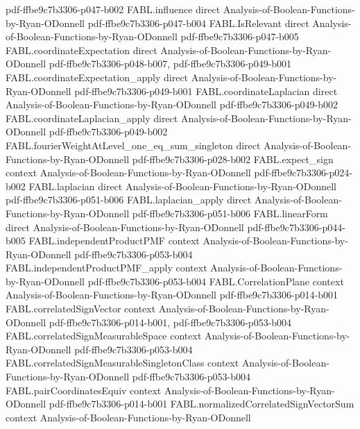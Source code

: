 \begin{theorem}
  {pdf-ffbe9c7b3306-p047-b002}
\proofstep
  {FABL.influence}
  {direct}
  {Analysis-of-Boolean-Functions-by-Ryan-ODonnell}
  {pdf-ffbe9c7b3306-p047-b004}
\proofstep
  {FABL.IsRelevant}
  {direct}
  {Analysis-of-Boolean-Functions-by-Ryan-ODonnell}
  {pdf-ffbe9c7b3306-p047-b005}
\proofstep
  {FABL.coordinateExpectation}
  {direct}
  {Analysis-of-Boolean-Functions-by-Ryan-ODonnell}
  {pdf-ffbe9c7b3306-p048-b007,
    pdf-ffbe9c7b3306-p049-b001}
\proofstep
  {FABL.coordinateExpectation_apply}
  {direct}
  {Analysis-of-Boolean-Functions-by-Ryan-ODonnell}
  {pdf-ffbe9c7b3306-p049-b001}
\proofstep
  {FABL.coordinateLaplacian}
  {direct}
  {Analysis-of-Boolean-Functions-by-Ryan-ODonnell}
  {pdf-ffbe9c7b3306-p049-b002}
\proofstep
  {FABL.coordinateLaplacian_apply}
  {direct}
  {Analysis-of-Boolean-Functions-by-Ryan-ODonnell}
  {pdf-ffbe9c7b3306-p049-b002}
\proofstep
  {FABL.fourierWeightAtLevel_one_eq_sum_singleton}
  {direct}
  {Analysis-of-Boolean-Functions-by-Ryan-ODonnell}
  {pdf-ffbe9c7b3306-p028-b002}
\proofstep
  {FABL.expect_sign}
  {context}
  {Analysis-of-Boolean-Functions-by-Ryan-ODonnell}
  {pdf-ffbe9c7b3306-p024-b002}
\proofstep
  {FABL.laplacian}
  {direct}
  {Analysis-of-Boolean-Functions-by-Ryan-ODonnell}
  {pdf-ffbe9c7b3306-p051-b006}
\proofstep
  {FABL.laplacian_apply}
  {direct}
  {Analysis-of-Boolean-Functions-by-Ryan-ODonnell}
  {pdf-ffbe9c7b3306-p051-b006}
\proofstep
  {FABL.linearForm}
  {direct}
  {Analysis-of-Boolean-Functions-by-Ryan-ODonnell}
  {pdf-ffbe9c7b3306-p044-b005}
\proofstep
  {FABL.independentProductPMF}
  {context}
  {Analysis-of-Boolean-Functions-by-Ryan-ODonnell}
  {pdf-ffbe9c7b3306-p053-b004}
\proofstep
  {FABL.independentProductPMF_apply}
  {context}
  {Analysis-of-Boolean-Functions-by-Ryan-ODonnell}
  {pdf-ffbe9c7b3306-p053-b004}
\proofstep
  {FABL.CorrelationPlane}
  {context}
  {Analysis-of-Boolean-Functions-by-Ryan-ODonnell}
  {pdf-ffbe9c7b3306-p014-b001}
\proofstep
  {FABL.correlatedSignVector}
  {context}
  {Analysis-of-Boolean-Functions-by-Ryan-ODonnell}
  {pdf-ffbe9c7b3306-p014-b001,
    pdf-ffbe9c7b3306-p053-b004}
\proofstep
  {FABL.correlatedSignMeasurableSpace}
  {context}
  {Analysis-of-Boolean-Functions-by-Ryan-ODonnell}
  {pdf-ffbe9c7b3306-p053-b004}
\proofstep
  {FABL.correlatedSignMeasurableSingletonClass}
  {context}
  {Analysis-of-Boolean-Functions-by-Ryan-ODonnell}
  {pdf-ffbe9c7b3306-p053-b004}
\proofstep
  {FABL.pairCoordinatesEquiv}
  {context}
  {Analysis-of-Boolean-Functions-by-Ryan-ODonnell}
  {pdf-ffbe9c7b3306-p014-b001}
\proofstep
  {FABL.normalizedCorrelatedSignVectorSum}
  {context}
  {Analysis-of-Boolean-Functions-by-Ryan-ODonnell}

\end{theorem}
